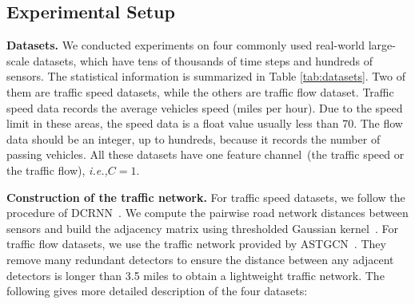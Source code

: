 \documentclass[sigconf, nonacm]{acmart}
\newcommand{\ie}{\textit{i.e.,}\xspace}
\begin{document}
\subsection{Experimental Setup}
\noindent\textbf{Datasets.} 
We conducted experiments on four commonly used real-world large-scale datasets, which have tens of thousands of time steps and hundreds of sensors.
The statistical information is summarized in Table \ref{tab:datasets}.
Two of them are traffic speed datasets, while the others are traffic flow dataset. 
Traffic speed data records the average vehicles speed (miles per hour). 
Due to the speed limit in these areas, the speed data is a float value usually less than 70.
The flow data should be an integer, up to hundreds, because it records the number of passing vehicles.
All these datasets have one feature channel~(the traffic speed or the traffic flow), \ie $C=1$.

\noindent\textbf{Construction of the traffic network.}
For traffic speed datasets, we follow the procedure of DCRNN~\cite{2017DCRNN}.
We compute the pairwise road network distances between sensors and build the adjacency matrix using thresholded Gaussian kernel~\cite{Gaussian}. 
For traffic flow datasets, we use the traffic network provided by ASTGCN~\cite{2019ASTGCN}. They remove many redundant detectors to ensure the distance between any adjacent detectors is longer than 3.5 miles to obtain a lightweight traffic network. The following gives more detailed description of the four datasets:
\end{document}
